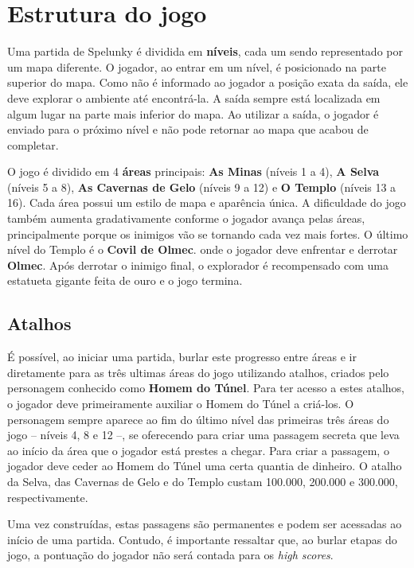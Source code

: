\section{\label{section:spelunky-structure}Estrutura do jogo}
Uma partida de Spelunky é dividida em \textbf{níveis}, cada um sendo
representado por um mapa diferente. O jogador, ao entrar em um nível, é
posicionado na parte superior do mapa. Como não é informado ao jogador a posição
exata da saída, ele deve explorar o ambiente até encontrá-la. A saída sempre
está localizada em algum lugar na parte mais inferior do mapa. Ao utilizar a
saída, o jogador é enviado para o próximo nível e não pode retornar ao mapa que
acabou de completar.

O jogo é dividido em 4 \textbf{áreas} principais: \textbf{As Minas} (níveis 1 a
4), \textbf{A Selva} (níveis 5 a 8), \textbf{As Cavernas de Gelo} (níveis 9 a
12) e \textbf{O Templo} (níveis 13 a 16). Cada área possui um estilo de mapa e
aparência única. A dificuldade do jogo também aumenta gradativamente conforme o
jogador avança pelas áreas, principalmente porque os inimigos vão se tornando
cada vez mais fortes. O último nível do Templo é o \textbf{Covil de Olmec}. onde
o jogador deve enfrentar e derrotar \textbf{Olmec}. Após derrotar o inimigo
final, o explorador é recompensado com uma estatueta gigante feita de ouro e o
jogo termina.


\subsection{Atalhos}
É possível, ao iniciar uma partida, burlar este progresso entre áreas e ir
diretamente para as três ultimas áreas do jogo utilizando atalhos, criados pelo
personagem conhecido como \textbf{Homem do Túnel}. Para ter acesso a estes
atalhos, o jogador deve primeiramente auxiliar o Homem do Túnel a criá-los. O
personagem sempre aparece ao fim do último nível das primeiras três áreas do
jogo -- níveis 4, 8 e 12 --, se oferecendo para criar uma passagem secreta que
leva ao início da área que o jogador está prestes a chegar. Para criar a
passagem, o jogador deve ceder ao Homem do Túnel uma certa quantia de dinheiro.
O atalho da Selva, das Cavernas de Gelo e do Templo custam 100.000, 200.000 e
300.000, respectivamente.

Uma vez construídas, estas passagens são permanentes e podem ser acessadas ao
início de uma partida. Contudo, é importante ressaltar que, ao burlar etapas do
jogo, a pontuação do jogador não será contada para os \textit{high scores}.

